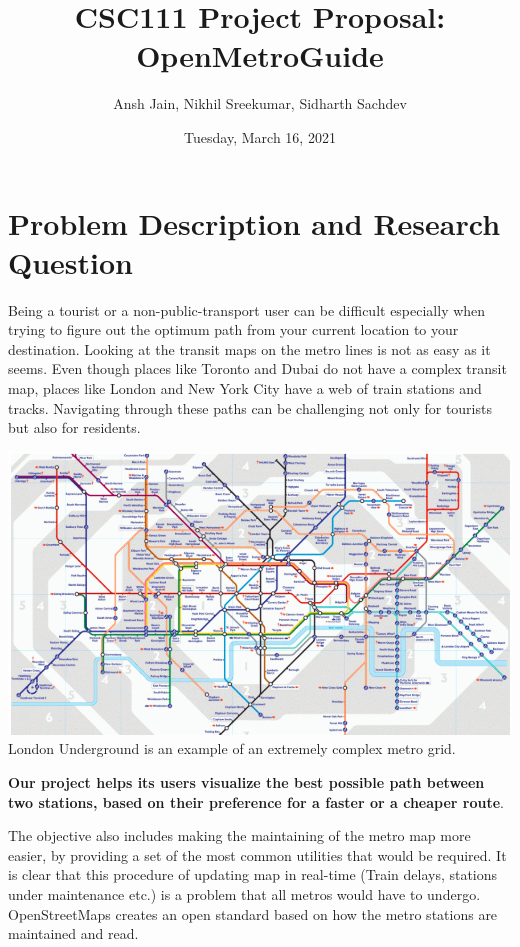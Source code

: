 \documentclass[fontsize=11pt]{article}
\title{CSC111 Project Proposal: OpenMetroGuide}
\author{Ansh Jain, Nikhil Sreekumar, Sidharth Sachdev}
\date{Tuesday, March 16, 2021}
\begin{document}
\maketitle

\section*{Problem Description and Research Question}

Being a tourist or a non-public-transport user can be difficult especially when trying to figure out the optimum path from your current location to your destination. Looking at the transit maps on the metro lines is not as easy as it seems. Even though places like Toronto and Dubai do not have a complex transit map, places like London and New York City have a web of train stations and tracks. Navigating through these paths can be challenging not only for tourists but also for residents.\newline


\begin{center}
	\includegraphics[width = 14cm]{London Transit Map.png}\newline
	London Underground is an example of an extremely complex metro grid.
\end{center}

\textbf{Our project helps its users visualize the best possible path between two stations, based on their preference for a faster or a cheaper route}.\newline 

The objective also includes making the maintaining of the metro map more easier, by providing a set of the most common utilities that would be required. It is clear that this procedure of updating map in real-time (Train delays, stations under maintenance etc.) is a problem that all metros would have to undergo. OpenStreetMaps creates an open standard  based on how the metro stations are maintained and read.\newline
\end{document}
